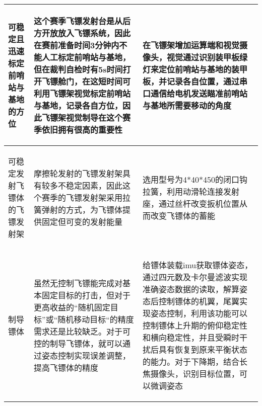 \begin{longtable}{ p{2cm} | p{7.8cm} | p{6cm} |}
    \hline
    
        \begin{center}
            可稳定且迅速标定前哨站与基地的方位 
        \end{center} \cellcolor{gndcolor} &
        \begin{center}
            这个赛季飞镖发射台是从后方开放放入飞镖系统，因此在赛前准备时间3分钟内不能人工标定前哨站与基地，但在裁判自检时有5s时间打开飞镖舱门，在这短时间可利用飞镖架视觉标定前哨站与基地，记录各自方位，因此飞镖架视觉制导在这个赛季依旧拥有很高的重要性
        \end{center} \cellcolor{gndcolor} &
        \begin{center}
            在飞镖架增加运算端和视觉摄像头，视觉通过识别装甲板绿灯来定位前哨站与基地的装甲板，并记录各自位置，通过串口通信给电机发送瞄准前哨站与基地所需要移动的角度
        \end{center} \cellcolor{gndcolor} \\

    \hline
    
        \begin{center}
            可稳定发射飞镖体的飞镖发射架
        \end{center} &
        \begin{center}
            摩擦轮发射的飞镖发射架具有较多不稳定因素，因此这个赛季的飞镖发射架采用拉簧弹射的方式，为飞镖体提供固定但可变的发射能量
        \end{center} &
        \begin{center}
            选用型号为4*40*450的闭口钩拉簧，利用动滑轮连接发射座，通过丝杆改变扳机位置从而改变飞镖体的蓄能
        \end{center} \\
        
    \hline
    
        \begin{center}
            制导镖体
        \end{center} &
        \begin{center}
            虽然无控制飞镖能完成对基本固定目标的打击，但对于更高收益的“随机固定目标”或“随机移动目标“的精度需求还是比较缺乏。对于可控的制导飞镖体，就可以通过姿态控制实现误差调整，提高飞镖体的精度
        \end{center} &
        \begin{center}
            给镖体装载imu获取镖体姿态，通过四元数及卡尔曼滤波实现准确姿态数据的读取，解算姿态后控制镖体的机翼，尾翼实现姿态控制，利用该功能可以控制镖体上升期的俯仰稳定性和横向稳定性，并且受瞬时干扰后具有恢复到原来平衡状态的能力。对于下降期，结合长焦摄像头，识别目标位置，可以微调姿态
        \end{center} \\
        
    \hline
    
\end{longtable}
